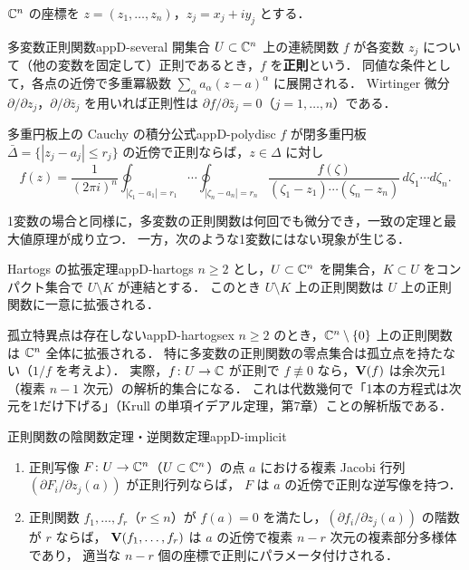 $\mathbb{C}^n$ の座標を $z=(z_1,\dots,z_n)$，$z_j=x_j+iy_j$ とする．

\begin{mydef}{多変数正則関数}{appD-several}
開集合 $U\subset\mathbb{C}^n$ 上の連続関数 $f$ が各変数 $z_j$ について（他の変数を固定して）正則であるとき，$f$ を\textbf{正則}という．
同値な条件として，各点の近傍で多重冪級数 $\sum_\alpha a_\alpha(z-a)^\alpha$ に展開される．
Wirtinger 微分 $\partial/\partial z_j$，$\partial/\partial\bar z_j$ を用いれば正則性は $\partial f/\partial\bar z_j=0$（$j=1,\dots,n$）である．
\end{mydef}

\begin{mythm}{多重円板上の Cauchy の積分公式}{appD-polydisc}
$f$ が閉多重円板 $\bar\Delta=\{|z_j-a_j|\leq r_j\}$ の近傍で正則ならば，$z\in\Delta$ に対し
\[
f(z)=\frac1{(2\pi i)^n}\oint_{|\zeta_1-a_1|=r_1}\!\!\cdots\oint_{|\zeta_n-a_n|=r_n}\frac{f(\zeta)}{(\zeta_1-z_1)\cdots(\zeta_n-z_n)}\,d\zeta_1\cdots d\zeta_n .
\]
\end{mythm}

1変数の場合と同様に，多変数の正則関数は何回でも微分でき，一致の定理と最大値原理が成り立つ．
一方，次のような1変数にはない現象が生じる．

\begin{mythm}{Hartogs の拡張定理}{appD-hartogs}
$n\geq2$ とし，$U\subset\mathbb{C}^n$ を開集合，$K\subset U$ をコンパクト集合で $U\setminus K$ が連結とする．
このとき $U\setminus K$ 上の正則関数は $U$ 上の正則関数に一意に拡張される．
\end{mythm}

\begin{myex}{孤立特異点は存在しない}{appD-hartogsex}
$n\geq2$ のとき，$\mathbb{C}^n\setminus\{0\}$ 上の正則関数は $\mathbb{C}^n$ 全体に拡張される．
特に多変数の正則関数の零点集合は孤立点を持たない（$1/f$ を考えよ）．
実際，$f\colon U\to\mathbb{C}$ が正則で $f\not\equiv0$ なら，$\mathbf{V}(f)$ は余次元1（複素 $n-1$ 次元）の解析的集合になる．
これは代数幾何で「1本の方程式は次元を1だけ下げる」（Krull の単項イデアル定理，第7章）ことの解析版である．
\end{myex}

\begin{mythm}{正則関数の陰関数定理・逆関数定理}{appD-implicit}
\begin{enumerate}
\item 正則写像 $F\colon U\to\mathbb{C}^n$（$U\subset\mathbb{C}^n$）の点 $a$ における複素 Jacobi 行列 $(\partial F_i/\partial z_j(a))$ が正則行列ならば，
$F$ は $a$ の近傍で正則な逆写像を持つ．
\item 正則関数 $f_1,\dots,f_r$（$r\leq n$）が $f(a)=0$ を満たし，$(\partial f_i/\partial z_j(a))$ の階数が $r$ ならば，
$\mathbf{V}(f_1,\dots,f_r)$ は $a$ の近傍で複素 $n-r$ 次元の複素部分多様体であり，
適当な $n-r$ 個の座標で正則にパラメータ付けされる．
\end{enumerate}
\end{mythm}

